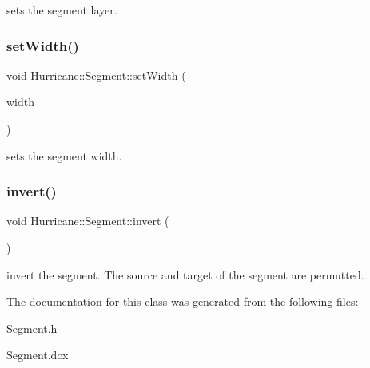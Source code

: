 sets the segment layer. \mbox{\label{classHurricane_1_1Segment_aec203d5d3aa96150979ba532d4bd1c7d}} 
\subsubsection{\texorpdfstring{set\+Width()}{setWidth()}}
{\footnotesize\ttfamily void Hurricane\+::\+Segment\+::set\+Width (\begin{DoxyParamCaption}\item[{const \mbox{\hyperlink{group__DbUGroup_ga4fbfa3e8c89347af76c9628ea06c4146}{Db\+U\+::\+Unit}} \&}]{width }\end{DoxyParamCaption})}

sets the segment width. \mbox{\label{classHurricane_1_1Segment_aceaa61242eb7275cf9c6a39cf1868c53}} 
\subsubsection{\texorpdfstring{invert()}{invert()}}
{\footnotesize\ttfamily void Hurricane\+::\+Segment\+::invert (\begin{DoxyParamCaption}{ }\end{DoxyParamCaption})}

invert the segment. The source and target of the segment are permutted. 

The documentation for this class was generated from the following files\+:\begin{DoxyCompactItemize}
\item 
Segment.\+h\item 
Segment.\+dox\end{DoxyCompactItemize}
